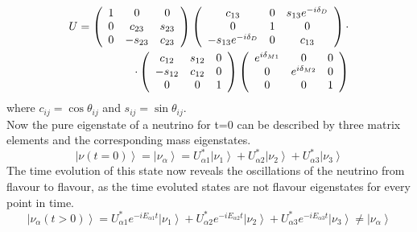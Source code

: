     \begin{equation}
	\centering
	\begin{split}
     U = \left(
	\begin{array}{ccc}
      	1 & 0 & 0\\
      	0 & c_{23} & s_{23}\\
      	0 & -s_{23} & c_{23}\\
   	\end{array}
	\right)
	\left(
	\begin{array}{ccc}
      	c_{13} & 0 & s_{13}e^{-i\delta_D}\\
      	0 & 1 & 0\\
      	-s_{13}e^{-i\delta_D} & 0 & c_{13}\\
      	\end{array}
	\right)\cdot\\
	\cdot\left(
	\begin{array}{ccc}
      	c_{12} & s_{12} & 0\\
      	-s_{12} & c_{12} & 0\\
      	0 & 0 & 1\\
      	\end{array}
	\right)
		\left(
	\begin{array}{ccc}
      	e^{i\delta_{M1}} & 0 & 0\\
      	0 & e^{i\delta_{M2}} & 0\\
      	0 & 0 & 1\\
      	\end{array}
	\right)
	\end{split}
    \end{equation}
    where $c_{ij}=\cos{\theta_{ij}}$ and $s_{ij}=\sin{\theta_{ij}}$.\\
	Now the pure eigenstate of a neutrino for t=0 can be described by three matrix elements and the corresponding mass eigenstates.
	\begin{equation}
		\left|\nu(t=0)\right> = \left|\nu_\alpha\right> = U^*_{\alpha1} \left|\nu_1\right> + U^*_{\alpha2} \left|\nu_2\right> + U^*_{\alpha3} \left|\nu_3\right> 
	\end{equation}
	The time evolution of this state now reveals the oscillations of the neutrino from flavour to flavour, as the time evoluted states are not flavour eigenstates for every point in time. 
	\begin{equation}
		\left|\nu_\alpha(t>0)\right> = U^*_{\alpha1} e^{-iE_{\alpha1}t}\left|\nu_1\right> + U^*_{\alpha2} e^{-iE_{\alpha2}t}\left|\nu_2\right> + U^*_{\alpha3}e^{-iE_{\alpha3}t} \left|\nu_3\right> \neq \left|\nu_\alpha\right> 
	\end{equation}
